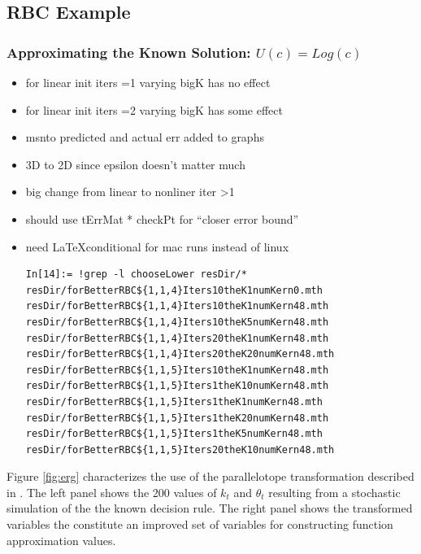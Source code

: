 \documentclass[12pt]{article}
\begin{document}
\subsection{RBC Example}
\label{sec:rbc-example}


\subsubsection{Approximating the Known Solution: $U(c) = Log(c)$ }
\label{sec:recov-known-solut}

\begin{itemize}
\item for linear init iters =1 varying bigK has no effect
\item for linear init iters =2 varying bigK has some effect
\item msnto predicted and actual err added to graphs
\item 3D to 2D since epsilon doesn't matter much
\item big change from linear to nonliner iter >1
\item should use tErrMat * checkPt for ``closer error bound''
\item need \LaTeX conditional for mac runs instead of linux
\begin{verbatim}
In[14]:= !grep -l chooseLower resDir/*
resDir/forBetterRBC${1,1,4}Iters10theK1numKern0.mth
resDir/forBetterRBC${1,1,4}Iters10theK1numKern48.mth
resDir/forBetterRBC${1,1,4}Iters10theK5numKern48.mth
resDir/forBetterRBC${1,1,4}Iters20theK1numKern48.mth
resDir/forBetterRBC${1,1,4}Iters20theK20numKern48.mth
resDir/forBetterRBC${1,1,5}Iters10theK1numKern48.mth
resDir/forBetterRBC${1,1,5}Iters1theK10numKern48.mth
resDir/forBetterRBC${1,1,5}Iters1theK1numKern48.mth
resDir/forBetterRBC${1,1,5}Iters1theK20numKern48.mth
resDir/forBetterRBC${1,1,5}Iters1theK5numKern48.mth
resDir/forBetterRBC${1,1,5}Iters20theK10numKern48.mth

\end{verbatim}
\end{itemize}
Figure \ref{fig:erg}  characterizes the use of the parallelotope
transformation described in \cite{Judd2013}. The left panel shows the 200 values of $k_t$ and $\theta_t$ resulting from a stochastic simulation of the the known decision rule. The right panel shows the transformed variables the constitute
an improved set of variables for constructing function approximation values.
\end{document}
